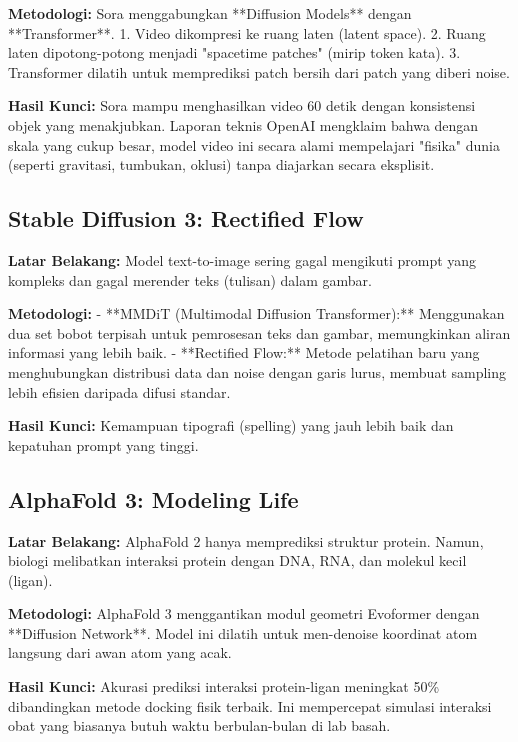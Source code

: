 \textbf{Metodologi:}
Sora menggabungkan **Diffusion Models** dengan **Transformer**.
1.  Video dikompresi ke ruang laten (latent space).
2.  Ruang laten dipotong-potong menjadi "spacetime patches" (mirip token kata).
3.  Transformer dilatih untuk memprediksi patch bersih dari patch yang diberi noise.

\textbf{Hasil Kunci:}
Sora mampu menghasilkan video 60 detik dengan konsistensi objek yang menakjubkan. Laporan teknis OpenAI mengklaim bahwa dengan skala yang cukup besar, model video ini secara alami mempelajari "fisika" dunia (seperti gravitasi, tumbukan, oklusi) tanpa diajarkan secara eksplisit.

\subsection{Stable Diffusion 3: Rectified Flow \cite{stability2024sd3}}

\textbf{Latar Belakang:}
Model text-to-image sering gagal mengikuti prompt yang kompleks dan gagal merender teks (tulisan) dalam gambar.

\textbf{Metodologi:}
- **MMDiT (Multimodal Diffusion Transformer):** Menggunakan dua set bobot terpisah untuk pemrosesan teks dan gambar, memungkinkan aliran informasi yang lebih baik.
- **Rectified Flow:** Metode pelatihan baru yang menghubungkan distribusi data dan noise dengan garis lurus, membuat sampling lebih efisien daripada difusi standar.

\textbf{Hasil Kunci:}
Kemampuan tipografi (spelling) yang jauh lebih baik dan kepatuhan prompt yang tinggi.

\subsection{AlphaFold 3: Modeling Life \cite{deepmind2024alphafold3}}

\textbf{Latar Belakang:}
AlphaFold 2 hanya memprediksi struktur protein. Namun, biologi melibatkan interaksi protein dengan DNA, RNA, dan molekul kecil (ligan).

\textbf{Metodologi:}
AlphaFold 3 menggantikan modul geometri Evoformer dengan **Diffusion Network**. Model ini dilatih untuk men-denoise koordinat atom langsung dari awan atom yang acak.

\textbf{Hasil Kunci:}
Akurasi prediksi interaksi protein-ligan meningkat 50\% dibandingkan metode docking fisik terbaik. Ini mempercepat simulasi interaksi obat yang biasanya butuh waktu berbulan-bulan di lab basah.

